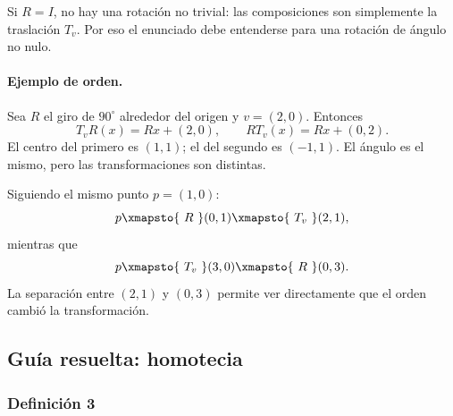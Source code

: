 \begin{center}
\end{center}

\begin{atencion}
Si \(R=I\), no hay una rotación no trivial: las composiciones son simplemente la traslación
\(T_v\). Por eso el enunciado debe entenderse para una rotación de ángulo no nulo.
\end{atencion}

\paragraph{Ejemplo de orden.}
Sea \(R\) el giro de \(90^\circ\) alrededor del origen y \(v=(2,0)\). Entonces
\[
  T_vR(x)=Rx+(2,0),
  \qquad
  RT_v(x)=Rx+(0,2).
\]
El centro del primero es \((1,1)\); el del segundo es \((-1,1)\). El ángulo es el mismo,
pero las transformaciones son distintas.

Siguiendo el mismo punto \(p=(1,0)\):
\[
p\xmapsto{\ R\ }(0,1)
\xmapsto{\ T_v\ }(2,1),
\]
mientras que
\[
p\xmapsto{\ T_v\ }(3,0)
\xmapsto{\ R\ }(0,3).
\]
La separación entre \((2,1)\) y \((0,3)\) permite ver directamente que el orden cambió la
transformación.

\subsection{Guía resuelta: homotecia}

\subsubsection{Definición 3}

